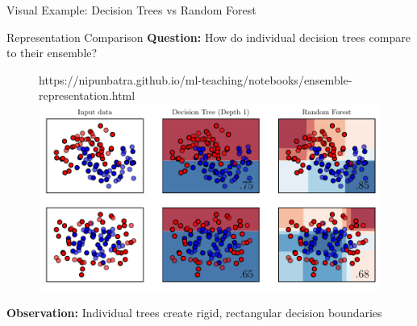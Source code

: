 \documentclass[8pt]{beamer}
\newcommand{\fitpic}[1]{\begin{adjustbox}{max width=\linewidth, max totalheight=0.78\textheight}#1\end{adjustbox}}
\begin{document}
\begin{frame}{Visual Example: Decision Trees vs Random Forest}
\begin{alertbox}{Representation Comparison}
\textbf{Question:} How do individual decision trees compare to their ensemble?
\end{alertbox}

\begin{figure}[htp]
  \centering
  \begin{notebookbox}{https://nipunbatra.github.io/ml-teaching/notebooks/ensemble-representation.html}
    \fitpic{\includegraphics[scale=0.6]{../assets/ensemble/figures/1-representation.pdf}}
  \end{notebookbox}
\end{figure}

\begin{keypointsbox}
\textbf{Observation:} Individual trees create rigid, rectangular decision boundaries
\end{keypointsbox}
\end{frame}
\end{document}
